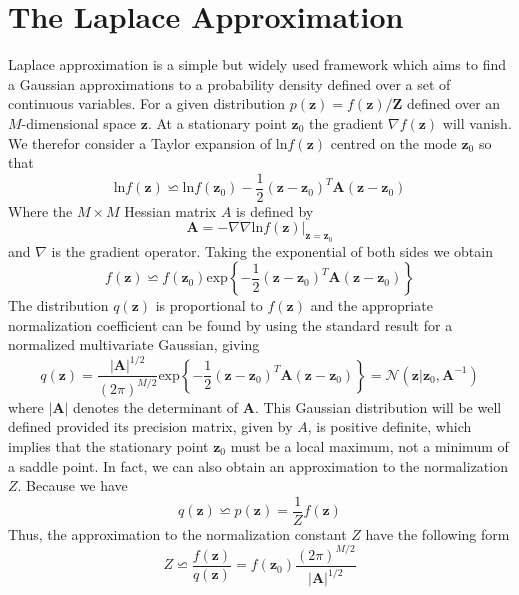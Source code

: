 \documentclass{article}
\begin{document}
	\section{The Laplace Approximation}
	Laplace approximation is a simple but widely used framework which aims to find a Gaussian approximations to a probability density defined over a set of continuous variables. For a given distribution $p(\mathbf{z}) = f(\mathbf{z})/\mathbf{Z}$ defined over an $M$-dimensional space $\mathbf{z}$. At a stationary point $\mathbf{z}_0$ the gradient $\nabla f(\mathbf{z})$ will vanish. We therefor consider a Taylor expansion of ln$f(\mathbf{z})$ centred on the mode $\mathbf{z}_0$ so that
	\begin{equation}
	\text{ln}f(\mathbf{z}) \backsimeq \text{ln}f(\mathbf{z}_0)  - \frac{1}{2}(\mathbf{z}-\mathbf{z}_0)^T\mathbf{A}(\mathbf{z}-\mathbf{z}_0)
	\end{equation}
	Where the $M \times M$ Hessian matrix $A$ is defined by 
	\begin{equation}
	\mathbf{A} = -\nabla \nabla \text{ln}f(\mathbf{z})|_{\mathbf{z}=\mathbf{z}_0}
	\end{equation}
	and $\nabla$ is the gradient operator. Taking the exponential of both sides we obtain
	\begin{equation}
	f(\mathbf{z}) \backsimeq f(\mathbf{z}_0)\text{exp}\left\{-\frac{1}{2}(\mathbf{z}-\mathbf{z}_0)^T\mathbf{A}(\mathbf{z}-\mathbf{z}_0)\right\}
	\end{equation}
	The distribution $q(\mathbf{z})$ is proportional to $f(\mathbf{z})$ and the appropriate normalization coefficient can be found by using the standard result for a normalized multivariate Gaussian, giving
	\begin{equation}
	q(\mathbf{z}) = \frac{|\mathbf{A}|^{1/2}}{(2\pi)^{M/2}}\text{exp}\left\{-\frac{1}{2}(\mathbf{z}-\mathbf{z}_0)^T\mathbf{A}(\mathbf{z}-\mathbf{z}_0)\right\} = \mathcal{N}(\mathbf{z}|\mathbf{z}_0,\mathbf{A}^{-1})
	\end{equation}
	where $|\mathbf{A}|$ denotes the determinant of $\mathbf{A}$. This Gaussian distribution will be well defined provided its precision matrix, given by $A$, is positive definite, which implies that the stationary point $\mathbf{z}_0$ must be a local maximum, not a minimum of a saddle point. In fact, we can also obtain an approximation to the normalization $Z$. Because we have
	\begin{equation}
	q(\mathbf{z}) \backsimeq p(\mathbf{\mathbf{z}}) = \frac{1}{Z}f(\mathbf{z})
	\end{equation} 
	Thus, the approximation to the normalization constant $Z$ have the following form
	\begin{equation}
	Z \backsimeq \frac{f(\mathbf{z})}{q(\mathbf{z})} = f(\mathbf{z}_0)\frac{(2\pi)^{M/2}}{|\mathbf{A}|^{1/2}} \label{eq:7}
	\end{equation}
\end{document}
